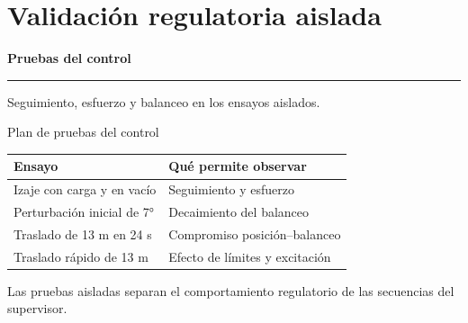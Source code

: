 \documentclass[aspectratio=169,11pt]{beamer}
\begin{document}
\section{Validación regulatoria aislada}
\begin{frame}[plain,label=seccion3]
\vfill
{\fontsize{25}{29}\selectfont\bfseries Pruebas del control\par}
\vspace{4mm}\textcolor{accent}{\rule{.75\linewidth}{1pt}}\par\vspace{3mm}
{\large Seguimiento, esfuerzo y balanceo en los ensayos aislados.\par}\vfill
{}
\end{frame}
\begin{frame}[t,label=slide23]{Plan de pruebas del control}
\begin{center}
{\small\renewcommand{\arraystretch}{1.0}
\begin{tabular}{p{5.2cm}p{8.5cm}}\toprule
Ensayo & Qué permite observar\\\midrule
Izaje con carga y en vacío & Seguimiento y esfuerzo\\
Perturbación inicial de 7° & Decaimiento del balanceo\\
Traslado de 13 m en 24 s & Compromiso posición–balanceo\\
Traslado rápido de 13 m & Efecto de límites y excitación\\
\bottomrule\end{tabular}}\end{center}
Las pruebas aisladas separan el comportamiento regulatorio de las secuencias del supervisor.
\end{frame}
\end{document}
